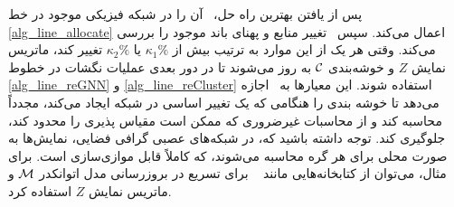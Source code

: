 پس از یافتن بهترین راه حل،  \ourAlg\  آن را در شبکه فیزیکی موجود در خط \ref {alg_line_allocate} اعمال می‌کند. سپس \ourAlg\ تغییر منابع و پهنای باند موجود را بررسی می‌کند. وقتی هر یک از این موارد به ترتیب بیش از $\kappa_1\%$ یا $\kappa_2\%$ تغییر کند، ماتریس نمایش $ Z $ و خوشه‌بندی $\mathcal{C}$ به روز می‌شوند تا در دور بعدی عملیات نگشات در خطوط  \ref{alg_line_reGNN} و \ref{alg_line_reCluster} استفاده شوند.
این معیارها به   \ourAlg\ اجازه می‌دهد تا خوشه بندی را هنگامی که یک تغییر اساسی در شبکه ایجاد می‌کند، مجدداً محاسبه کند و از محاسبات غیرضروری که ممکن است مقیاس پذیری را محدود کند، جلوگیری کند.
%
توجه داشته باشید که، در شبکه‌های عصبی گرافی فضایی، نمایش‌ها به صورت محلی برای هر گره محاسبه می‌شوند، که کاملاً قابل موازی‌سازی است. برای مثال، می‌توان از کتابخانه‌هایی مانند 
 ~ \cite {pytorch_scatter}
 برای تسریع در بروزرسانی مدل اتوانکدر $\mathcal{M}$ و ماتریس نمایش $ Z $ استفاده کرد.




    